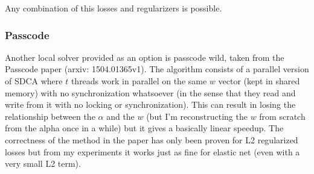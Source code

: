 Any combination of this losses and regularizers is possible.

\subsubsection{Passcode}
Another local solver provided as an option is passcode wild, taken from the Passcode paper (arxiv: 1504.01365v1). The
algorithm consists of a parallel version of SDCA where $t$ threads work in parallel on the same $w$ vector (kept in shared
memory) with no synchronization whatsoever (in the sense that they read and write from it with no locking or synchronization).
This can result in losing the relationship between the $\alpha$ and the $w$ (but I'm reconstructing the $w$ from scratch
from the alpha once in a while) but it gives a basically linear speedup. The correctness of the method in the paper
has only been proven for L2 regularized losses but from my experiments it works just as fine for elastic net (even with
a very small L2 term).